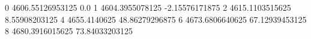 0 4606.55126953125 0.0
1 4604.3955078125 -2.15576171875
2 4615.1103515625 8.55908203125
4 4655.4140625 48.86279296875
6 4673.6806640625 67.12939453125
8 4680.3916015625 73.84033203125
